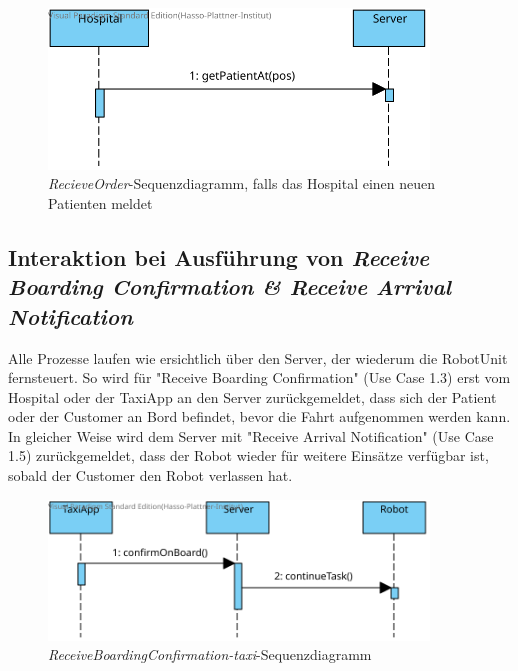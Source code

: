 \begin{figure}[H]
	\centering
	\includegraphics[width=0.9\textwidth]{img/2-Entwurf-RecieveOrder-Hosp}
	\caption{\emph{RecieveOrder}-Sequenzdiagramm, falls das Hospital einen neuen Patienten meldet}
	\label{SequenzDiagrammInteraktion}
\end{figure}



\subsection*{Interaktion bei Ausführung von \emph{Receive Boarding Confirmation \& Receive Arrival Notification}}

Alle Prozesse laufen wie ersichtlich über den Server, der wiederum die RobotUnit fernsteuert. 
So wird für "Receive Boarding Confirmation" (Use Case 1.3) erst vom Hospital oder der TaxiApp an den Server zurückgemeldet, dass sich der Patient oder der Customer an Bord befindet, bevor die Fahrt aufgenommen werden kann. 
In gleicher Weise wird dem Server mit "Receive Arrival Notification" (Use Case 1.5) zurückgemeldet, dass der Robot wieder für weitere Einsätze verfügbar ist, sobald der Customer den Robot verlassen hat.  \\

\begin{figure}[H]
	\centering
	\includegraphics[width=0.9\textwidth]{img/2-Entwurf-ReceiveBoardingConfirmation-taxi}
	\caption{\emph{ReceiveBoardingConfirmation-taxi}-Sequenzdiagramm}
	\label{SequenzDiagrammInteraktion}
\end{figure}

